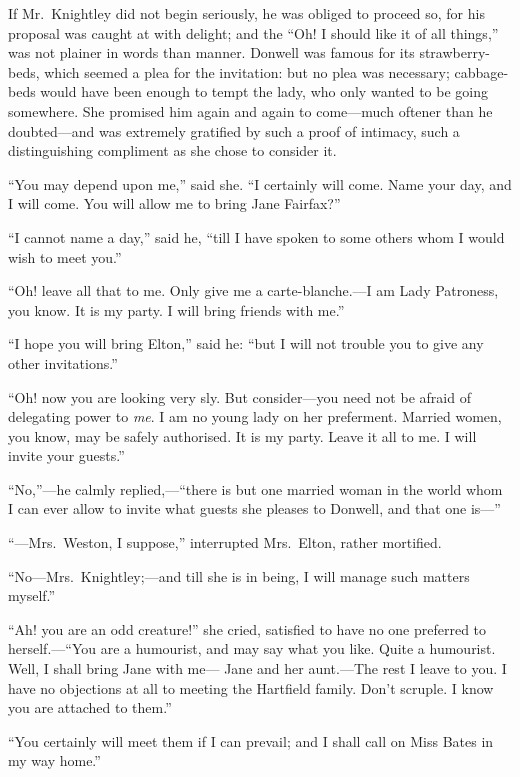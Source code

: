If Mr.\ Knightley did not begin seriously, he was obliged to proceed so,
for his proposal was caught at with delight; and the ``Oh!  I should
like it of all things,'' was not plainer in words than manner.
Donwell was famous for its strawberry-beds, which seemed a plea for
the invitation:  but no plea was necessary; cabbage-beds would have
been enough to tempt the lady, who only wanted to be going somewhere.
She promised him again and again to come---much oftener than
he doubted---and was extremely gratified by such a proof of intimacy,
such a distinguishing compliment as she chose to consider it.

``You may depend upon me,'' said she.  ``I certainly will come.
Name your day, and I will come.  You will allow me to bring
Jane Fairfax?''

``I cannot name a day,'' said he, ``till I have spoken to some others
whom I would wish to meet you.''

``Oh! leave all that to me.  Only give me a carte-blanche.---I am
Lady Patroness, you know.  It is my party.  I will bring friends
with me.''

``I hope you will bring Elton,'' said he:  ``but I will not trouble
you to give any other invitations.''

``Oh! now you are looking very sly.  But consider---you need not be afraid
of delegating power to \emph{me}.  I am no young lady on her preferment.
Married women, you know, may be safely authorised.  It is my party.
Leave it all to me.  I will invite your guests.''

``No,''---he calmly replied,---``there is but one married woman in the world
whom I can ever allow to invite what guests she pleases to Donwell,
and that one is---''

``---Mrs.\ Weston, I suppose,'' interrupted Mrs.\ Elton, rather mortified.

``No---Mrs.\ Knightley;---and till she is in being, I will manage
such matters myself.''

``Ah! you are an odd creature!'' she cried, satisfied to have no
one preferred to herself.---``You are a humourist, and may say what
you like.  Quite a humourist.  Well, I shall bring Jane with me---%
Jane and her aunt.---The rest I leave to you.  I have no objections
at all to meeting the Hartfield family.  Don't scruple.  I know
you are attached to them.''

``You certainly will meet them if I can prevail; and I shall call
on Miss Bates in my way home.''

